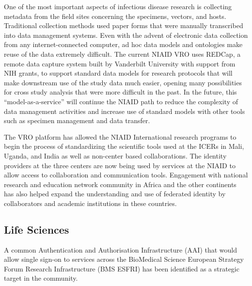 \documentclass[fleqn,11pt]{wlscirep}
\begin{document}
{One of the most important aspects of infectious disease research is collecting metadata from the field sites concerning the specimens, vectors, and hosts.  Traditional collection methods used paper forms that were manually transcribed into data management systems.  Even with the advent of electronic data collection from any internet-connected computer, ad hoc data models and ontologies make reuse of the data extremely difficult.  The current NIAID VRO uses REDCap, a remote data capture system built by Vanderbilt University with support from NIH grants, to support standard data models for research protocols that will make downstream use of the study data much easier, opening many possibilities for cross study analysis that were more difficult in the past.  In the future, this “model-as-a-service” will continue the NIAID path to reduce the complexity of data management activities and increase use of standard models with other tools such as specimen management and data transfer.

The VRO platform has allowed the NIAID International research programs to begin the process of standardizing the scientific tools used at the ICERs in Mali, Uganda, and India as well as non-center based collaborations.  The identity providers at the three centers are now being used by services at the NIAID to allow access to collaboration and communication tools.  Engagement with national research and education network community in Africa and the other continents has also helped expand the understanding and use of federated identity by collaborators and academic institutions in these countries.


\subsection{Life Sciences}
A common Authentication and Authorisation Infrastructure (AAI) that would allow single sign-on to services across the BioMedical Science European Strategy Forum Research Infrastructure (BMS ESFRI) has been identified as a strategic target in the community.

}
\end{document}
